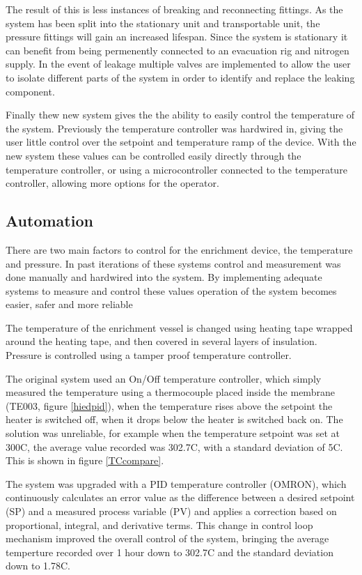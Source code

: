 The result of this is less instances of breaking and reconnecting fittings. As the system has been split into the stationary unit and transportable unit, the pressure fittings will gain an increased lifespan. Since the system is stationary it can benefit from being permenently connected to an evacuation rig and nitrogen supply. In the event of leakage multiple valves are implemented to allow the user to isolate different parts of the system in order to identify and replace the leaking component.

Finally thew new system gives the the ability to easily control the temperature of the system. Previously the temperature controller was hardwired in, giving the user little control over the setpoint and temperature ramp of the device. With the new system these values can be controlled easily directly through the temperature controller, or using a microcontroller connected to the temperature controller, allowing more options for the operator.

\subsection{Automation}\label{dataproc}
There are two main factors to control for the enrichment device, the temperature and pressure. In past iterations of these systems control and measurement was done manually and hardwired into the system. By implementing adequate systems to measure and control these values operation of the system becomes easier, safer and more reliable 

The temperature of the enrichment vessel is changed using heating tape wrapped around the heating tape, and then covered in several layers of insulation. Pressure is controlled using a tamper proof temperature controller.

The original system used an On/Off temperature controller, which simply measured the temperature using a thermocouple placed inside the membrane (TE003, figure \ref{hiedpid}), when the temperature rises above the setpoint the heater is switched off, when it drops below the heater is switched back on. The solution was unreliable, for example when the temperature setpoint was set at 300\textdegree C, the average value recorded was 302.7\textdegree C, with a standard deviation of 5\textdegree C. This is shown in figure \ref{TCcompare}. 

The system was upgraded with a PID temperature controller (OMRON), which continuously calculates an error value as the difference between a desired setpoint (SP) and a measured process variable (PV) and applies a correction based on proportional, integral, and derivative terms. This change in control loop mechanism improved the overall control of the system, bringing the average temperture recorded over 1 hour down to 302.7\textdegree C and the standard deviation down to 1.78\textdegree C.

